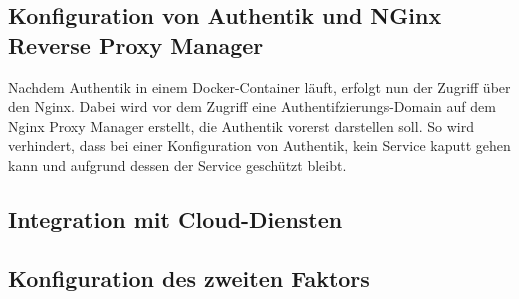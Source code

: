 \subsection{Konfiguration von Authentik und NGinx Reverse Proxy Manager}
\label{sec:Konfiguration von Authentik und NGinx Reverse Proxy Manager}
Nachdem Authentik in einem Docker-Container läuft, erfolgt nun der Zugriff über den Nginx. Dabei wird vor dem Zugriff 
eine Authentifzierungs-Domain auf dem Nginx Proxy Manager erstellt, die Authentik vorerst darstellen soll. 
So wird verhindert, dass bei einer Konfiguration von Authentik, kein Service kaputt gehen kann und aufgrund dessen der 
Service geschützt bleibt.


\subsection{Integration mit Cloud-Diensten}
\label{sec:Integration mit Cloud-Diensten}

\subsection{Konfiguration des zweiten Faktors}
\label{sec:Konfiguration des zweiten Faktors}